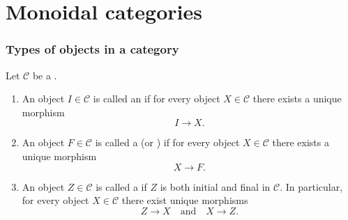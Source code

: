 

\section{Monoidal categories}









% 
% 

\subsubsection{Types of objects in a category}

\begin{definition} \label{definition:initial_final_zero_object_in_a_category}
Let $\mathcal{C}$ be a .

\begin{enumerate}
    \item An object $I \in \mathcal{C}$ is called an  if for every object $X \in \mathcal{C}$ there exists a unique morphism
    $$I \to X.$$

    \item An object $F \in \mathcal{C}$ is called a  (or ) if for every object $X \in \mathcal{C}$ there exists a unique morphism
    $$X \to F.$$

    \item An object $Z \in \mathcal{C}$ is called a  if $Z$ is both initial and final in $\mathcal{C}$. In particular, for every object $X \in \mathcal{C}$ there exist unique morphisms
    $$Z \to X \quad \text{and} \quad X \to Z.$$
\end{enumerate}
\end{definition}




